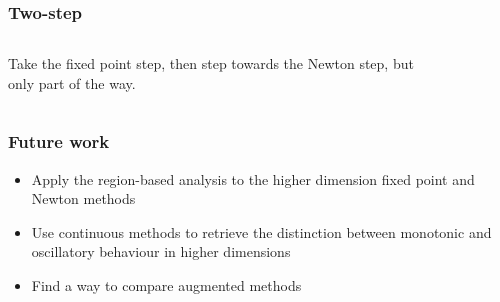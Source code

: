 \documentclass{beamer}
\begin{document}
\begin{frame}
\frametitle{Two-step}

\begin{columns}
	\begin{column}{0.5\textwidth}
		Take the fixed point step, then step towards the Newton step, but only part of the way.
	\end{column}
	\begin{column}{0.5\textwidth}
		\begin{figure}
		\end{figure}
	\end{column}
\end{columns}

\end{frame}

\begin{frame}
\frametitle{Future work}

\begin{itemize}
\item Apply the region-based analysis to the higher dimension fixed point and Newton methods
\item Use continuous methods to retrieve the distinction between monotonic and oscillatory behaviour in higher dimensions
\item Find a way to compare augmented methods
\end{itemize}

\end{frame}
\end{document}
